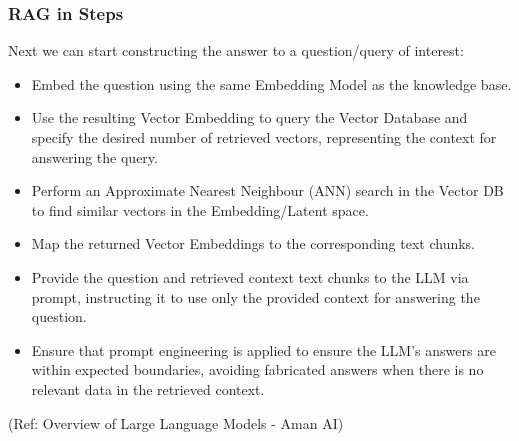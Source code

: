 \begin{frame}[fragile]\frametitle{RAG in Steps}

Next we can start constructing the answer to a question/query of interest:

\begin{itemize}
\item Embed the question using the same Embedding Model as the knowledge base.
\item Use the resulting Vector Embedding to query the Vector Database and specify the desired number of retrieved vectors, representing the context for answering the query.
\item Perform an Approximate Nearest Neighbour (ANN) search in the Vector DB to find similar vectors in the Embedding/Latent space.
\item Map the returned Vector Embeddings to the corresponding text chunks.
\item Provide the question and retrieved context text chunks to the LLM via prompt, instructing it to use only the provided context for answering the question.
\item Ensure that prompt engineering is applied to ensure the LLM's answers are within expected boundaries, avoiding fabricated answers when there is no relevant data in the retrieved context.
\end{itemize}

{\tiny (Ref: Overview of Large Language Models - Aman AI)}

\end{frame}

